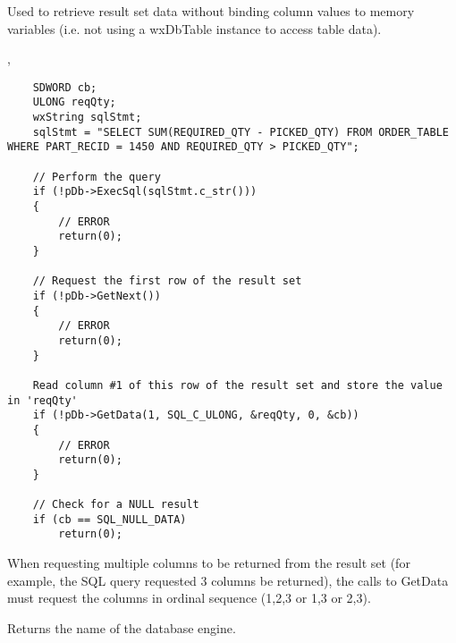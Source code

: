 
Used to retrieve result set data without binding column values to memory variables (i.e. not using a wxDbTable instance to access table data).




, 

\begin{verbatim}
	SDWORD cb;
	ULONG reqQty;
	wxString sqlStmt;
	sqlStmt = "SELECT SUM(REQUIRED_QTY - PICKED_QTY) FROM ORDER_TABLE WHERE PART_RECID = 1450 AND REQUIRED_QTY > PICKED_QTY";

	// Perform the query
	if (!pDb->ExecSql(sqlStmt.c_str()))
	{
		// ERROR
		return(0);
	}

	// Request the first row of the result set
	if (!pDb->GetNext())
	{
		// ERROR
		return(0);
	}

	Read column #1 of this row of the result set and store the value in 'reqQty'
	if (!pDb->GetData(1, SQL_C_ULONG, &reqQty, 0, &cb))
	{
		// ERROR
		return(0);
	}

	// Check for a NULL result
	if (cb == SQL_NULL_DATA)
		return(0);
\end{verbatim}


When requesting multiple columns to be returned from the result set (for example, the SQL query
requested 3 columns be returned), the calls to GetData must request the columns in ordinal
sequence (1,2,3 or 1,3 or 2,3).  

\label{wxdbgetdatabasename}


Returns the name of the database engine.

